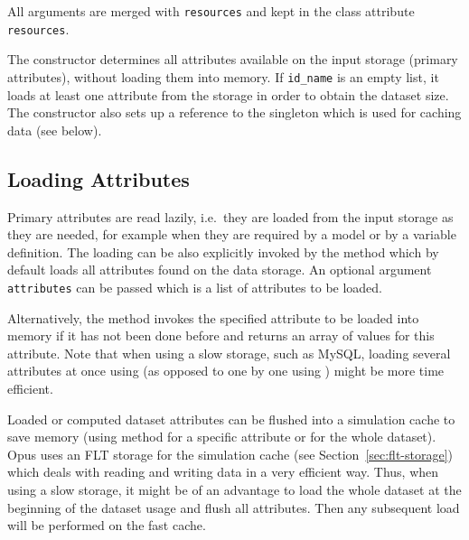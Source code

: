All arguments are merged with \verb|resources| and kept in the class attribute \attributesindex
\verb|resources|.

The constructor determines all attributes \attributesindex available on the input storage
(primary attributes), \primaryattributesindex without loading them into memory. If \verb|id_name|
is an empty list, it loads at least one attribute \attributesindex from the storage in order to
obtain the dataset \datasetindex size. The constructor also sets up a reference to the
singleton  which is used for caching data (see below).

%
\subsection{Loading Attributes}
%
Primary attributes \primaryattributesindex are read lazily, i.e.\ they are loaded from the input
storage as they are needed, for example when they are required by a model or
by a variable definition. The loading can be also explicitly invoked by the
method  \datasetindex which by default loads all attributes \attributesindex found on
the data storage. An optional argument \verb|attributes| \attributesindex can be passed which
is a list of attributes \attributesindex to be loaded.

Alternatively, the method  \attributesindex invokes the specified
attribute \attributesindex to be loaded into memory if it has not been done before and returns
an array of values for this attribute. \attributesindex Note that when using a slow storage,
such as MySQL, loading several attributes \attributesindex at once using  \datasetindex
(as opposed to one by one using ) \attributesindex might be more
time efficient. 

Loaded or computed dataset \datasetindex attributes \attributesindex can be flushed into a simulation cache to
save memory  (using method
 \attributesindex for a specific attribute \attributesindex or
 for the whole dataset). \datasetindex Opus uses an FLT storage for
the simulation cache (see Section~\ref{sec:flt-storage}) which deals with
reading and writing data in a very efficient way. Thus, when using a slow
storage, it might be of an advantage to load the whole dataset \datasetindex at the beginning
of the dataset \datasetindex usage and flush all attributes. \attributesindex Then any subsequent load will be
performed on the fast cache.

